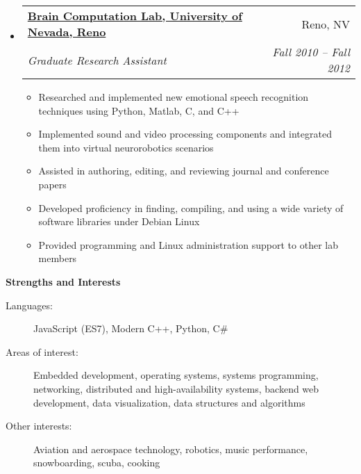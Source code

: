 \documentclass[letterpaper,11pt]{article}
\makeatletter
\newcommand{\resitem}[1]{\item #1 \vspace{-2pt}}
\newcommand{\resheading}[1]{{\large \colorbox{mygrey}{\begin{minipage}{\textwidth}{\textbf{#1 \vphantom{p\^{E}}}}\end{minipage}}}}
\newcommand{\ressubheading}[4]{
\begin{tabular*}{6.5in}{l@{\extracolsep{\fill}}r}
		\textbf{#1} & #2 \\
		\textit{#3} & \textit{#4} \\
\end{tabular*}\vspace{-6pt}}
\makeatother
\begin{document}
\begin{itemize}
		\item
			\ressubheading{\href{http://www.cse.unr.edu/brain/}{Brain Computation Lab, University of Nevada, Reno}}{Reno, NV}{Graduate Research Assistant}{Fall 2010 -- Fall 2012}
				{ \footnotesize
				\begin{itemize}
					\resitem{Researched and implemented new emotional speech recognition techniques using Python, Matlab, C, and C++}
					\resitem{Implemented sound and video processing components and integrated them into virtual neurorobotics scenarios}
					\resitem{Assisted in authoring, editing, and reviewing journal and conference papers}
					\resitem{Developed proficiency in finding, compiling, and using a wide variety of software libraries under Debian Linux}
					\resitem{Provided programming and Linux administration support to other lab members}
				\end{itemize}
				}
	\end{itemize}  %

\resheading{Strengths and Interests}
	\linebreak
	\begin{description}
		\item[Languages:] { \footnotesize JavaScript (ES7), Modern C++, Python, C\# }
		\item[Areas of interest:] { \footnotesize Embedded development, operating systems, systems programming, networking, distributed and high-availability systems, backend web development, data visualization, data structures and algorithms}
		\item[Other interests:] { \footnotesize Aviation and aerospace technology, robotics, music performance, snowboarding, scuba, cooking }
	\end{description} %

\end{document}
